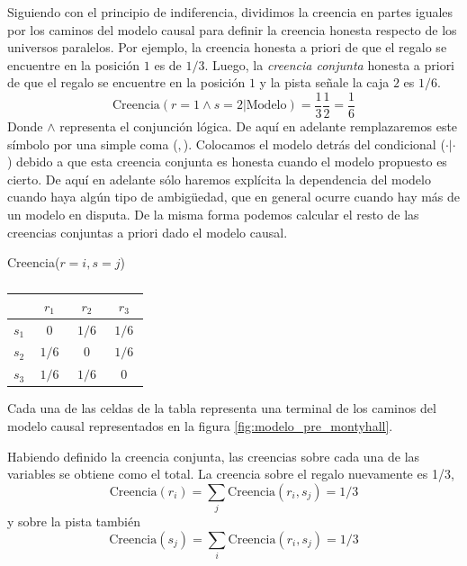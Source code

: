 \documentclass[a4paper,10pt]{book}
\theoremstyle{definition}
\begin{document}
%
Siguiendo con el principio de indiferencia, dividimos la creencia en partes iguales por los caminos del modelo causal para definir la creencia honesta respecto de los universos paralelos.
%
Por ejemplo, la creencia honesta a priori de que el regalo se encuentre en la posición $1$ es de $1/3$.
%
Luego, la \emph{creencia conjunta} honesta a priori de que el regalo se encuentre en la posición $1$ y la pista señale la caja $2$ es $1/6$.
%
\begin{equation}
\text{Creencia}(r=1 \wedge s=2 | \text{Modelo} ) = \frac{1}{3} \frac{1}{2} = \frac{1}{6}
\end{equation}
%
Donde $\wedge$ representa el conjunción lógica.
%
De aquí en adelante remplazaremos este símbolo por una simple coma ($,$).
%
Colocamos el modelo detrás del condicional ($\cdot|\cdot$) debido a que esta creencia conjunta es honesta cuando el modelo propuesto es cierto.
%
De aquí en adelante sólo haremos explícita la dependencia del modelo cuando haya algún tipo de ambigüedad, que en general ocurre cuando hay más de un modelo en disputa.
%
De la misma forma podemos calcular el resto de las creencias conjuntas a priori dado el modelo causal.
%
\begin{table}[H]
\centering
Creencia($r=i, s=j$) \\[0.1cm]
 \begin{tabular}{c|c|c|c|} \setlength\tabcolsep{0.4cm}
        & \, $r_1$ \, &  \, $r_2$ \, & \, $r_3$ \, \\ \hline 
  $s_1$ & $0$ & $1/6$ & $1/6$  \\ \hline
  $s_2$ & $1/6$ & $0$ & $1/6$  \\ \hline
  $s_3$ & $1/6$ & $1/6$ & $0$ \\ \hline 
  \end{tabular}
  \caption{}
\end{table}
%
Cada una de las celdas de la tabla representa una terminal de los caminos del modelo causal representados en la figura \ref{fig:modelo_pre_montyhall}.
%


Habiendo definido la creencia conjunta, las creencias sobre cada una de las variables se obtiene como el total.
La creencia sobre el regalo nuevamente es 1/3,
\begin{equation}
\text{Creencia}(r_i) = \sum_j \text{Creencia}(r_i, s_j) = 1/3
\end{equation}
y sobre la pista también
\begin{equation}
\text{Creencia}(s_j) = \sum_i \text{Creencia}(r_i, s_j) = 1/3
\end{equation}
\end{document}
